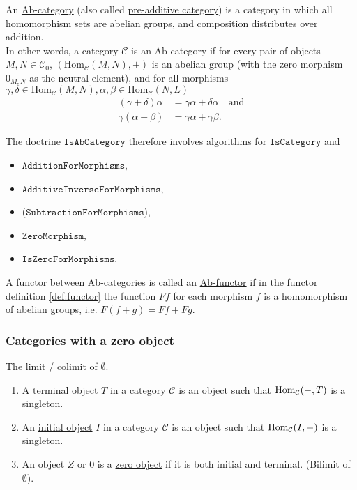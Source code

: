 \begin{definition}[Ab-category]
An \ul{Ab-category} (also called \ul{pre-additive category}) is a category in which all homomorphism sets are abelian groups,
and composition distributes over addition.\\
In other words, a category $\mathcal{C}$ is an Ab-category if for every pair of objects $M,N \in \mathcal{C}_{0}$,
$( \mathrm{Hom}_{\mathcal{C}}(M,N), + )$ is an abelian group (with the zero morphism $0_{M,N}$ as the neutral element),
and for all morphisms $\gamma, \delta \in \mathrm{Hom}_{\mathcal{C}}(M,N),
\alpha, \beta \in \mathrm{Hom}_{\mathcal{C}}(N,L)$
\begin{align}
(\gamma + \delta)\alpha &=\label{eq:dist1} \gamma\alpha + \delta\alpha\quad \mathrm{ and }\\
\gamma(\alpha+\beta) &=\label{eq:dist2} \gamma\alpha + \gamma\beta.
\end{align}
\end{definition}

\begin{doctrine}[Ab-category]\label{doc:ab-category}
The doctrine $\mathtt{IsAbCategory}$ therefore involves algorithms for $\mathtt{IsCategory}$ and
\begin{itemize}
\item $\mathtt{AdditionForMorphisms}$,
\item $\mathtt{AdditiveInverseForMorphisms}$,
\item ($\mathtt{SubtractionForMorphisms}$),
\item $\mathtt{ZeroMorphism}$,
\item $\mathtt{IsZeroForMorphisms}$.
\end{itemize}
\end{doctrine}

\begin{definition}[Ab-functor]
A functor between Ab-categories is called an \ul{Ab-functor} if in the functor definition \ref{def:functor} the function $Ff$ for each
morphism $f$ is a homomorphism of abelian groups, i.e. $F(f+g) = Ff + Fg$.
\end{definition}

\subsubsection{Categories with a zero object}

\begin{remark}\label{def:init_term_zero_object}
The limit / colimit of $\emptyset$.
\renewcommand{\labelenumi}{(\theenumi)}
\begin{enumerate}
\item A \ul{terminal object} $T$ in a category $\mathcal{C}$ is an object such that $\textup{Hom}_{\mathcal{C}}(-,T)$ is a singleton.
\item An \ul{initial object} $I$ in a category $\mathcal{C}$ is an object such that $\textup{Hom}_{\mathcal{C}}(I,-)$ is a singleton.
\item An object $Z$ or $0$ is a \ul{zero object} if it is both initial and terminal. (Bilimit of $\emptyset$).
\end{enumerate}
\end{remark}

